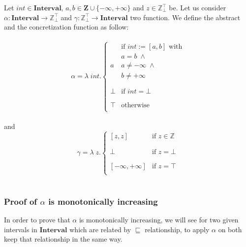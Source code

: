 \documentclass{article}
\newcommand{\interval}{\textbf{Interval}}
\newcommand{\ztop}{\mathbb{Z}_{\bot}^{\top}}
\begin{document}
Let $int \in \interval$, $a, b \in \mathbf{Z} \cup \{-\infty, +\infty \}$ and $z \in \ztop$ be. Let us consider $\alpha : \interval \longrightarrow \ztop$ and $\gamma : \ztop \longrightarrow \interval$ two function. We define the abstract and the concretization function as follow:\\\\
\begin{equation*}
    \alpha = \lambda \; int. \left\{
\begin{array}{ll}
      & \text{if $int:= [a,b]$ with}\\
      & \text{$a = b \; \land$}\\
      a & \text{$a \neq - \infty \; \land$}\\
      & \text{$b \neq + \infty$}\\
      \\ \\
        \bot   & \text{if $int = \bot$}\\
      \\ \\
      \top & \text{otherwise} \\
\end{array} 
\right.
\end{equation*}
\\
and
\\
\begin{equation*}
    \gamma = \lambda \; z. \left\{
\begin{array}{ll}
      [ z, z]   & \text{if $z \in \mathbb{Z}$}\\
      \\ \\
        \bot   & \text{if $z = \bot$}\\
\\ \\
       \left[- \infty , + \infty \right]  & \text{if $z = \top $}\\
        
\end{array} 
\right.
\end{equation*}\\

\subsubsection*{Proof of $\alpha$ is monotonically increasing}
In order to prove that $\alpha$ is monotonically increasing, we will see for two given intervals in $\interval$ which are related by $\sqsubseteq$ relationship, to apply $\alpha$ on both keep that relationship in the same way. \\
\end{document}
